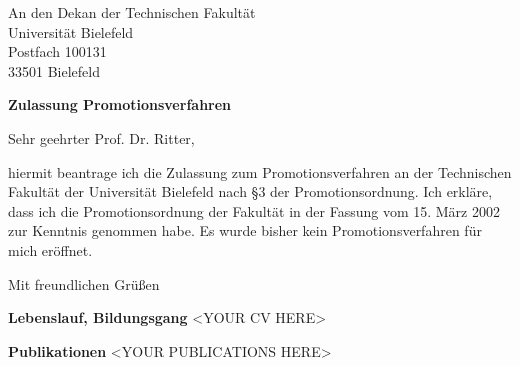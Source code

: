 \documentclass[a4paper,11pt]{letter}
\begin{document}
\begin{letter}{An den Dekan der Technischen Fakult\"at\\ Universit\"at Bielefeld\\ Postfach 100131\\ 33501 Bielefeld}
\opening{ {\bf Zulassung Promotionsverfahren}}

Sehr geehrter Prof. Dr. Ritter,

hiermit beantrage ich die Zulassung zum Promotionsverfahren an der Technischen Fakult\"at der Universit\"at Bielefeld nach
\S3 der Promotionsordnung. Ich erkl\"are, dass ich die Promotionsordnung der Fakult\"at in der Fassung vom 15. M\"arz 2002 zur 
Kenntnis genommen habe. Es wurde bisher kein Promotionsverfahren f\"ur mich er\"offnet.

\closing{Mit freundlichen Gr\"u{\ss}en}
\newpage

{\bf\large Lebenslauf, Bildungsgang}
<YOUR CV HERE>

{\bf\large Publikationen}
<YOUR PUBLICATIONS HERE>
\end{letter}
\end{document}
